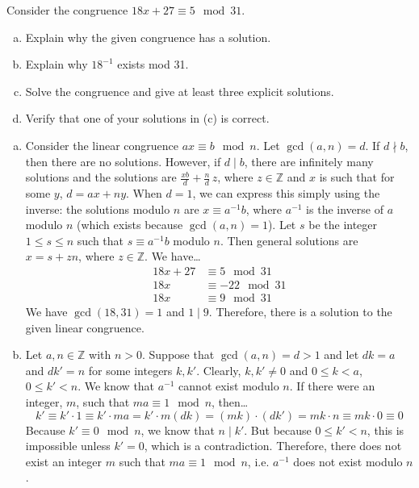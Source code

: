 \documentclass[11pt,letterpaper]{article}
\begin{document}
\newpage



 Consider the congruence $18x + 27 \equiv 5 \mod 31$. 
	\begin{enumerate}[(a)]
	\item Explain why the given congruence has a solution. 
	\item Explain why $18^{-1}$ exists mod 31. 
	\item Solve the congruence and give at least three explicit solutions. 
	\item Verify that one of your solutions in (c) is correct. 
	\end{enumerate} \pspace

\sol 
\begin{enumerate}[(a)]
\item Consider the linear congruence $ax \equiv b \mod n$. Let $\gcd(a, n)= d$. If $d \nmid b$, then there are no solutions. However, if $d \mid b$, there are infinitely many solutions and the solutions are $\frac{xb}{d} + \frac{n}{d}\,z$, where $z \in \mathbb{Z}$ and $x$ is such that for some $y$, $d= ax + ny$. When $d= 1$, we can express this simply using the inverse: the solutions modulo $n$ are $x \equiv a^{-1}b$, where $a^{-1}$ is the inverse of $a$ modulo $n$ (which exists because $\gcd(a, n)= 1$). Let $s$ be the integer $1 \leq s \leq n$ such that $s \equiv a^{-1}b$ modulo $n$. Then general solutions are $x= s + zn$, where $z \in \mathbb{Z}$. We have\dots
	\[
	\begin{aligned}
	18x + 27 &\equiv 5 \mod 31 \\
	18x &\equiv -22 \mod 31 \\
	18x &\equiv 9 \mod 31
	\end{aligned}
	\]
We have $\gcd(18, 31)= 1$ and $1 \mid 9$. Therefore, there is a solution to the given linear congruence. \pspace

\item Let $a, n \in \mathbb{Z}$ with $n > 0$. Suppose that $\gcd(a, n)= d > 1$ and let $dk= a$ and $dk'= n$ for some integers $k, k'$. Clearly, $k, k' \neq 0$ and $0 \leq k < a$, $0 \leq k' < n$. We know that $a^{-1}$ cannot exist modulo $n$. If there were an integer, $m$, such that $ma \equiv 1 \mod n$, then\dots
	\[
	k' \equiv k' \cdot 1 \equiv k' \cdot ma= k' \cdot m(dk)= (mk) \cdot (dk')= mk \cdot n \equiv mk \cdot 0 \equiv 0
	\]
Because $k' \equiv 0 \mod n$, we know that $n \mid k'$. But because $0 \leq k' < n$, this is impossible unless $k'= 0$, which is a contradiction. Therefore, there does not exist an integer $m$ such that $ma \equiv 1 \mod n$, i.e. $a^{-1}$ does not exist modulo $n$. 


\end{enumerate}
\end{document}
